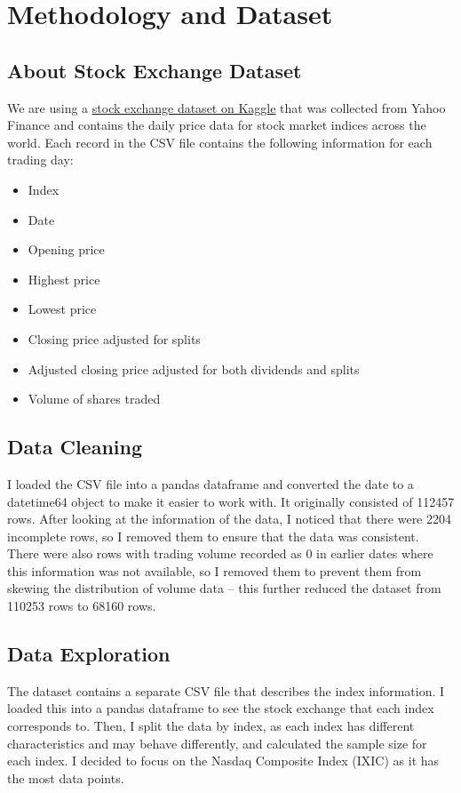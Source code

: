 \documentclass[a4paper, 11pt]{article}
\begin{document}
\section{Methodology and Dataset}

\subsection{About Stock Exchange Dataset}
We are using a \href{https://www.kaggle.com/datasets/mattiuzc/stock-exchange-data}{stock exchange dataset on Kaggle} that was collected from Yahoo Finance and contains the daily price data for stock market indices across the world. Each record in the CSV file contains the following information for each trading day:

\begin{itemize}
    \setlength\itemsep{0em}
    \item Index
    \item Date
    \item Opening price
    \item Highest price 
    \item Lowest price 
    \item Closing price adjusted for splits
    \item Adjusted closing price adjusted for both dividends and splits
    \item Volume of shares traded 
\end{itemize}

\subsection{Data Cleaning}
I loaded the CSV file into a pandas dataframe and converted the date to a datetime64 object to make it easier to work with. It originally consisted of 112457 rows. After looking at the information of the data, I noticed that there were 2204 incomplete rows, so I removed them to ensure that the data was consistent. There were also rows with trading volume recorded as 0 in earlier dates where this information was not available, so I removed them to prevent them from skewing the distribution of volume data -- this further reduced the dataset from 110253 rows to 68160 rows.

\subsection{Data Exploration}
The dataset contains a separate CSV file that describes the index information. I loaded this into a pandas dataframe to see the stock exchange that each index corresponds to. Then, I split the data by index, as each index has different characteristics and may behave differently, and calculated the sample size for each index. I decided to focus on the Nasdaq Composite Index (IXIC) as it has the most data points.
\end{document}

